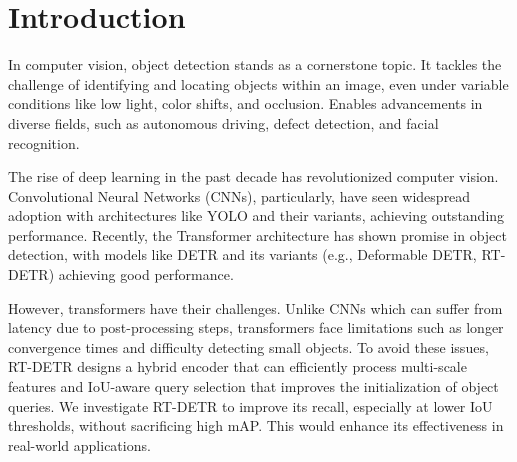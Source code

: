 \chapter{Introduction}
In computer vision, object detection stands as a cornerstone topic. It tackles the challenge of identifying and locating objects within an image, even under variable conditions like low light, color shifts, and occlusion. Enables advancements in diverse fields, such as autonomous driving, defect detection, and facial recognition. 

The rise of deep learning in the past decade has revolutionized computer vision. Convolutional Neural Networks (CNNs),  particularly, have seen widespread adoption with architectures like YOLO and their variants, achieving outstanding performance. Recently, the Transformer architecture has shown promise in object detection, with models like DETR and its variants (e.g., Deformable DETR, RT-DETR) achieving good performance.

However, transformers have their challenges. Unlike CNNs which can suffer from latency due to post-processing steps, transformers face limitations such as longer convergence times and difficulty detecting small objects. To avoid these issues, RT-DETR designs a hybrid encoder that can efficiently process multi-scale features and IoU-aware query selection that improves the initialization of object queries. We investigate RT-DETR to improve its recall, especially at lower IoU thresholds, without sacrificing high mAP. This would enhance its effectiveness in real-world applications.





% 
